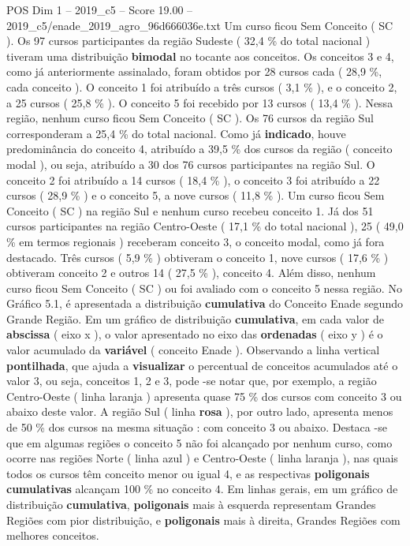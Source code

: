 \begin{textsample}{POS Dim 1 – 2019\_c5 – Score 19.00 – 2019\_c5/enade\_2019\_agro\_96d666036e.txt}
Um curso ficou Sem Conceito ( SC ).
Os 97 cursos participantes da região Sudeste ( 32,4 \% do total nacional ) tiveram uma distribuição \textbf{bimodal} no tocante aos conceitos.
Os conceitos 3 e 4, como já anteriormente assinalado, foram obtidos por 28 cursos cada ( 28,9 \%, cada conceito ).
O conceito 1 foi atribuído a três cursos ( 3,1 \% ), e o conceito 2, a 25 cursos ( 25,8 \% ).
O conceito 5 foi recebido por 13 cursos ( 13,4 \% ).
Nessa região, nenhum curso ficou Sem Conceito ( SC ).
Os 76 cursos da região Sul corresponderam a 25,4 \% do total nacional.
Como já \textbf{indicado}, houve predominância do conceito 4, atribuído a 39,5 \% dos cursos da região ( conceito modal ), ou seja, atribuído a 30 dos 76 cursos participantes na região Sul.
O conceito 2 foi atribuído a 14 cursos ( 18,4 \% ), o conceito 3 foi atribuído a 22 cursos ( 28,9 \% ) e o conceito 5, a nove cursos ( 11,8 \% ).
Um curso ficou Sem Conceito ( SC ) na região Sul e nenhum curso recebeu conceito 1.
Já dos 51 cursos participantes na região Centro-Oeste ( 17,1 \% do total nacional ), 25 ( 49,0 \% em termos regionais ) receberam conceito 3, o conceito modal, como já fora destacado.
Três cursos ( 5,9 \% ) obtiveram o conceito 1, nove cursos ( 17,6 \% ) obtiveram conceito 2 e outros 14 ( 27,5 \% ), conceito 4.
Além disso, nenhum curso ficou Sem Conceito ( SC ) ou foi avaliado com o conceito 5 nessa região.
No Gráfico 5.1, é apresentada a distribuição \textbf{cumulativa} do Conceito Enade segundo Grande Região.
Em um gráfico de distribuição \textbf{cumulativa}, em cada valor de \textbf{abscissa} ( eixo x ), o valor apresentado no eixo das \textbf{ordenadas} ( eixo y ) é o valor acumulado da \textbf{variável} ( conceito Enade ).
Observando a linha vertical \textbf{pontilhada}, que ajuda a \textbf{visualizar} o percentual de conceitos acumulados até o valor 3, ou seja, conceitos 1, 2 e 3, pode -se notar que, por exemplo, a região Centro-Oeste ( linha laranja ) apresenta quase 75 \% dos cursos com conceito 3 ou abaixo deste valor.
A região Sul ( linha \textbf{rosa} ), por outro lado, apresenta menos de 50 \% dos cursos na mesma situação : com conceito 3 ou abaixo.
Destaca -se que em algumas regiões o conceito 5 não foi alcançado por nenhum curso, como ocorre nas regiões Norte ( linha azul ) e Centro-Oeste ( linha laranja ), nas quais todos os cursos têm conceito menor ou igual 4, e as respectivas \textbf{poligonais} \textbf{cumulativas} alcançam 100 \% no conceito 4.
Em linhas gerais, em um gráfico de distribuição \textbf{cumulativa}, \textbf{poligonais} mais à esquerda representam Grandes Regiões com pior distribuição, e \textbf{poligonais} mais à direita, Grandes Regiões com melhores conceitos.

\end{textsample}
